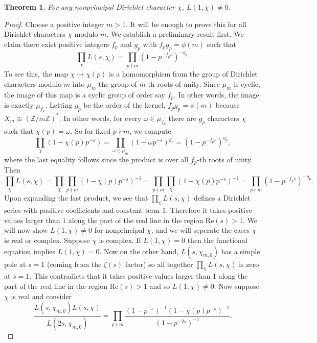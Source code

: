 \documentclass[12pt]{book}
\newtheorem{theorem}{Theorem}[section]
\theoremstyle{definition}\newframedtheorem{method}{Method}
\newcommand{\Z}{\mathbb{Z}}
\newcommand{\z}{\zeta}
\newcommand{\w}{\omega}
\newcommand{\<}{\langle}
\renewcommand{\>}{\rangle}
\newcommand{\conj}{\overline}
\newcommand{\cchi}{\conj{\chi}}
\renewcommand{\Re}{\mathrm{Re}}
\begin{document}
      \begin{theorem}\label{thm:nonvanishing_of_Dirichlet_L-functions_at_s=1}
        For any nonprincipal Dirichlet character $\chi$, $L(1,\chi) \neq 0$.
      \end{theorem}
      \begin{proof}
        Choose a positive integer $m > 1$. It will be enough to prove this for all Dirichlet characters $\chi$ modulo $m$. We establish a preliminary result first. We claim there exist positive integers $f_{p}$ and $g_{p}$ with $f_{p}g_{p} = \phi(m)$ such that
        \[
          \prod_{\chi}L(s,\chi) = \prod_{p \nmid m}(1-p^{-f_{p}s})^{-g_{p}}.
        \]
        To see this, the map $\chi \to \chi(p)$ is a homomorphism from the group of Dirichlet characters modulo $m$ into $\mu_{m}$ the group of $m$-th roots of unity. Since $\mu_{m}$ is cyclic, the image of this map is a cyclic group of order say $f_{p}$. In other words, the image is exactly $\mu_{f_{p}}$. Letting $g_{p}$ be the order of the kernel, $f_{p}g_{p} = \phi(m)$ because $X_{m} \cong (\Z/m\Z)^{\ast}$. In other words, for every $\w \in \mu_{f_{p}}$ there are $g_{p}$ characters $\chi$ such that $\chi(p) = \w$. So for fixed $p \nmid m$, we compute
        \[
          \prod_{\chi}(1-\chi(p)p^{-s}) = \prod_{\w \in \mu_{m}}(1-\w p^{-s})^{g_{p}} = (1-p^{-f_{p}s})^{g_{p}},
        \]
        where the last equality follows since the product is over all $f_{p}$-th roots of unity. Then
        \[
          \prod_{\chi}L(s,\chi) = \prod_{\chi}\prod_{p \nmid m}(1-\chi(p)p^{-s})^{-1} = \prod_{p \nmid m}\prod_{\chi}(1-\chi(p)p^{-s})^{-1} = \prod_{p \nmid m}(1-p^{-f_{p}s})^{-g_{p}}.
        \]
        Upon expanding the last product, we see that $\prod_{\chi}L(s,\chi)$ defines a Dirichlet series with positive coefficients and constant term $1$. Therefore it takes positive values larger than $1$ along the part of the real line in the region $\Re(s) > 1$. We will now show $L(1,\chi) \neq 0$ for nonprincipal $\chi$, and we will seperate the cases $\chi$ is real or complex. Suppose $\chi$ is complex. If $L(1,\chi) = 0$ then the functional equation implies $L(1,\cchi) = 0$. Now on the other hand, $L(s,\chi_{m,0})$ has a simple pole at $s = 1$ (coming from the $\z(s)$ factor) so all together $\prod_{\chi}L(s,\chi)$ is zero at $s = 1$. This contradicts that it takes positive values larger than $1$ along the part of the real line in the region $\Re(s) > 1$ and so $L(1,\chi) \neq 0$. Now suppose $\chi$ is real and consider
        \[
          \frac{L(s,\chi_{m,0})L(s,\chi)}{L(2s,\chi_{m,0})} = \prod_{p \nmid m}\frac{(1-p^{-s})^{-1}(1-\chi(p)p^{-s})^{-1}}{(1-p^{-2s})^{-1}}.
\]
\end{proof}
\end{document}
